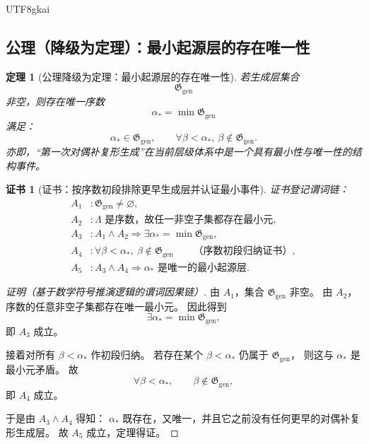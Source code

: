 \documentclass[12pt]{article}
\newtheorem{theorem}{定理}[section]
\newtheorem{Certificate}{证书}[section]
\begin{document}
\begin{CJK*}{UTF8}{gkai}
\subsection{公理（降级为定理）：最小起源层的存在唯一性}
\label{subsec:tex43-ch9-axiom-downgrade}

\begin{theorem}[公理降级为定理：最小起源层的存在唯一性]
\label{thm:tex43-cosmological-origin-layer}
若生成层集合
\[
  \mathfrak G_{\mathrm{gen}}
\]
非空，则存在唯一序数
\[
  \alpha_\ast=\min \mathfrak G_{\mathrm{gen}}
\]
满足：
\[
  \alpha_\ast\in \mathfrak G_{\mathrm{gen}},
  \qquad
  \forall \beta<\alpha_\ast,\ \beta\notin \mathfrak G_{\mathrm{gen}}.
\]
亦即，“第一次对偶补复形生成”在当前层级体系中是一个具有最小性与唯一性的结构事件。
\end{theorem}

\begin{Certificate}[证书：按序数初段排除更早生成层并认证最小事件]
\label{cert:tex43-cosmological-origin-layer}
证书登记谓词链：
\[
\begin{aligned}
  A_1 &: \mathfrak G_{\mathrm{gen}}\neq \varnothing,\\
  A_2 &: \Lambda\text{ 是序数，故任一非空子集都存在最小元},\\
  A_3 &: A_1\wedge A_2 \Rightarrow
         \exists \alpha_\ast=\min \mathfrak G_{\mathrm{gen}},\\
  A_4 &: \forall \beta<\alpha_\ast,\ \beta\notin \mathfrak G_{\mathrm{gen}}
         \qquad\text{（序数初段归纳证书）},\\
  A_5 &: A_3\wedge A_4 \Rightarrow
         \alpha_\ast\text{ 是唯一的最小起源层}.
\end{aligned}
\]
\end{Certificate}

\begin{proof}[证明（基于数学符号推演逻辑的谓词因果链）]
由 $A_1$，集合 $\mathfrak G_{\mathrm{gen}}$ 非空。
由 $A_2$，序数的任意非空子集都存在唯一最小元。
因此得到
\[
  \exists \alpha_\ast=\min \mathfrak G_{\mathrm{gen}},
\]
即 $A_3$ 成立。

接着对所有 $\beta<\alpha_\ast$ 作初段归纳。
若存在某个 $\beta<\alpha_\ast$ 仍属于 $\mathfrak G_{\mathrm{gen}}$，
则这与 $\alpha_\ast$ 是最小元矛盾。
故
\[
  \forall \beta<\alpha_\ast,\qquad \beta\notin \mathfrak G_{\mathrm{gen}},
\]
即 $A_4$ 成立。

于是由 $A_3\wedge A_4$ 得知：
$\alpha_\ast$ 既存在，又唯一，并且它之前没有任何更早的对偶补复形生成层。
故 $A_5$ 成立，定理得证。
\end{proof}


\end{CJK*}
\end{document}
